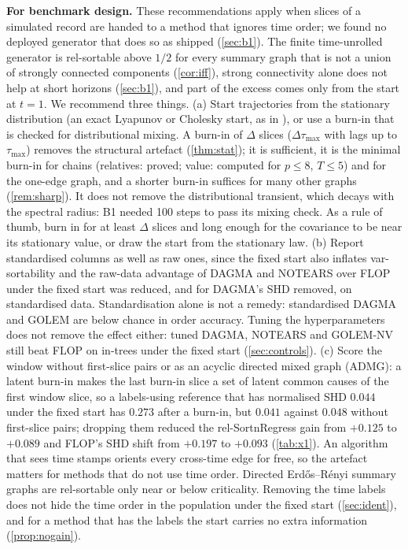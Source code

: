 \documentclass[pdflatex,sn-apa]{sn-jnl}
\theoremstyle{thmstyleone}
\theoremstyle{thmstylethree}
\theoremstyle{thmstyletwo}
\begin{document}
\textbf{For benchmark design.} These recommendations apply when slices of a
simulated record are handed to a method that ignores time order; we found no
deployed generator that does so as shipped (\cref{sec:b1}). The finite
time-unrolled generator is rel-sortable above $1/2$ for every summary graph
that is not a union of strongly connected components (\cref{cor:iff}), strong
connectivity alone does not help at short horizons (\cref{sec:b1}), and part of
the excess comes only from the start at $t=1$. We recommend three things. (a)
Start trajectories from the stationary distribution (an exact
Lyapunov or Cholesky start, as in \citealp{herman2025unitless}), or use a
burn-in that is checked for distributional mixing. A burn-in of $\Delta$ slices
($\Delta\tau_{\max}$ with lags up to $\tau_{\max}$) removes the structural
artefact (\cref{thm:stat}); it is sufficient, it is the minimal burn-in
for chains (relatives: proved; value: computed for $p\le8$, $T\le5$) and for the
one-edge graph, and a shorter burn-in suffices for many
other graphs (\cref{rem:sharp}). It does not remove the distributional transient, which
decays with the spectral radius: B1 needed 100 steps to pass its mixing check.
As a rule of thumb, burn in for at least $\Delta$ slices and long enough for
the covariance to be near its stationary value, or draw the start from the
stationary law. (b) Report standardised
columns as well as raw ones, since the fixed start also inflates
var-sortability and the raw-data advantage of DAGMA and NOTEARS over FLOP under
the fixed start was reduced, and for DAGMA's SHD removed, on standardised data.
Standardisation alone is not a remedy: standardised DAGMA and GOLEM are below
chance in order accuracy. Tuning the hyperparameters does not remove the effect
either: tuned DAGMA, NOTEARS and GOLEM-NV still beat FLOP on in-trees under the
fixed start (\cref{sec:controls}). (c) Score the window without first-slice pairs
or as an acyclic directed mixed graph (ADMG): a latent burn-in makes the last burn-in slice a set of latent
common causes of the first window slice, so a labels-using reference that has
normalised SHD $0.044$ under the fixed start has $0.273$ after a burn-in, but
$0.041$ against $0.048$ without first-slice pairs; dropping them reduced the
rel-SortnRegress gain from $+0.125$ to $+0.089$ and FLOP's SHD shift from
$+0.197$ to $+0.093$ (\cref{tab:x1}). An algorithm that sees time
stamps orients every cross-time edge for free, so the artefact matters for
methods that do not use time order. Directed Erd\H{o}s--R\'enyi summary graphs are rel-sortable only
near or below criticality. Removing the time labels does not hide the time order in
the population under the fixed start (\cref{sec:ident}), and for a method that
has the labels the start carries no extra information (\cref{prop:nogain}).
\end{document}
